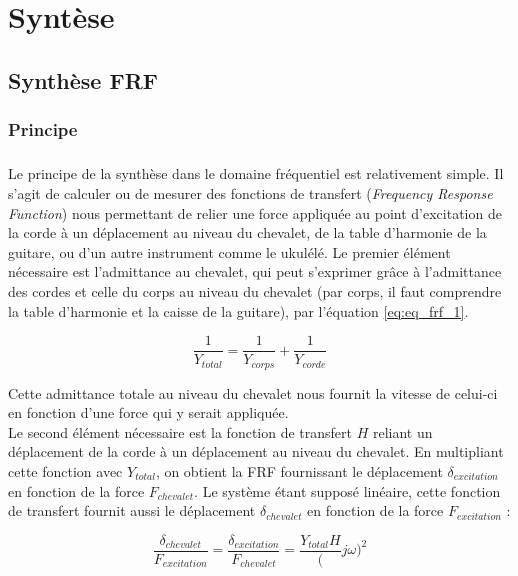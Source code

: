 \chapter{Syntèse}
\section{Synthèse FRF}

\subsection{Principe}
\paragraph*{} 

Le principe de la synthèse dans le domaine fréquentiel est relativement simple.
Il s'agit de calculer ou de mesurer des fonctions de transfert
(\textit{Frequency Response Function}) nous permettant de relier une force
appliquée au point d'excitation de la corde à un déplacement au niveau du
chevalet, de la table d'harmonie de la guitare, ou d'un autre instrument comme
le ukulélé. Le premier élément nécessaire est l'admittance au chevalet, qui
peut s'exprimer grâce à l'admittance des cordes et celle du corps au niveau du
chevalet (par corps, il faut comprendre la table d'harmonie et la caisse de la
guitare), par l'équation \ref{eq:eq_frf_1}.

\begin{equation}
  \frac{1}{Y_{total}} = \frac{1}{Y_{corps}} + \frac{1}{Y_{corde}}
  \label{eq:eq_frf_1}
\end{equation}

Cette admittance totale au niveau du chevalet nous fournit la vitesse de
celui-ci en fonction d'une force qui y serait appliquée. \\

Le second élément nécessaire est la fonction de transfert $H$ reliant un
déplacement de la corde à un déplacement au niveau du chevalet. En multipliant
cette fonction avec $Y_{total}$, on obtient la FRF fournissant le déplacement
$\delta_{excitation}$ en fonction de la force $F_{chevalet}$. Le système étant
supposé linéaire, cette fonction de transfert fournit aussi le déplacement
$\delta_{chevalet}$ en fonction de la force $F_{excitation}$ :

\begin{equation}
  \frac{\delta_{chevalet}}{F_{excitation}} = \frac{\delta_{excitation}}{F_{chevalet}} = \frac{Y_{total}H}({j\omega})^2
  \label{eq:eq_frf_2}
\end{equation}

